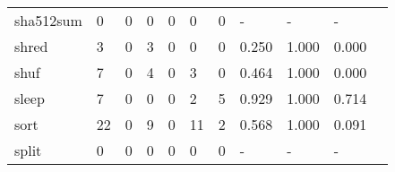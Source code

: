 \begin{longtable}{lp{1.2cm}p{1.2cm}p{1.2cm}p{1.2cm}p{1.2cm}p{1.2cm}p{1.2cm}p{1.2cm}p{1.2cm}p{1.2cm}}
sha512sum &                                     0 &                                                  0 &                                                0 &                                               0 &                                                0 &                                              0 &                                             - &                                                  - &                                                  - \\
shred     &                                     3 &                                                  0 &                                                3 &                                               0 &                                                0 &                                              0 &                                         0.250 &                                              1.000 &                                              0.000 \\
shuf      &                                     7 &                                                  0 &                                                4 &                                               0 &                                                3 &                                              0 &                                         0.464 &                                              1.000 &                                              0.000 \\
sleep     &                                     7 &                                                  0 &                                                0 &                                               0 &                                                2 &                                              5 &                                         0.929 &                                              1.000 &                                              0.714 \\
sort      &                                    22 &                                                  0 &                                                9 &                                               0 &                                               11 &                                              2 &                                         0.568 &                                              1.000 &                                              0.091 \\
split     &                                     0 &                                                  0 &                                                0 &                                               0 &                                                0 &                                              0 &                                             - &                                                  - &                                                  - \\

\end{longtable}
